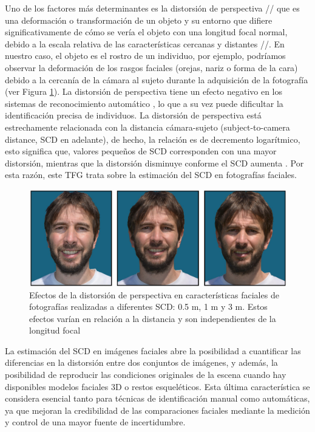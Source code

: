 Uno de los factores más determinantes es la distorsión de perspectiva \cite{8} // que es una deformación o transformación de un objeto y su entorno que difiere significativamente de cómo se vería el objeto con una longitud focal normal, debido a la escala relativa de las características cercanas y distantes //. En nuestro caso, el objeto es el rostro de un individuo, por ejemplo, podríamos observar la deformación de los rasgos faciales (orejas, nariz o forma de la cara) debido a la cercanía de la cámara al sujeto durante la adquisición de la fotografía \cite{12} (ver Figura \ref{fig1}). La distorsión de perspectiva tiene un efecto negativo en los sistemas de reconocimiento automático \cite{9,10,11}, lo que a su vez puede dificultar la identificación precisa de individuos. La distorsión de perspectiva está estrechamente relacionada con la distancia cámara-sujeto (subject-to-camera distance, SCD en adelante), de hecho, la relación es de decremento logarítmico, esto significa que, valores pequeños de SCD corresponden con una mayor distorsión, mientras que la distorsión disminuye conforme el SCD aumenta \cite{13}. Por esta razón, este TFG trata sobre la estimación del SCD en fotografías faciales.

\begin{figure}[h]
	\centering
	\includegraphics[scale=0.25]{imagenes/cap1/facial_distortion.png}
	\caption{Efectos de la distorsión de perspectiva en características faciales de fotografías realizadas a diferentes SCD: 0.5 m, 1 m y 3 m. Estos efectos varían en relación a la distancia y son independientes de la longitud focal \cite{14}}
	\label{fig1}
\end{figure}


La estimación del SCD en imágenes faciales abre la posibilidad a cuantificar las diferencias en la distorsión entre dos conjuntos de imágenes, y además, la posibilidad de reproducir las condiciones originales de la escena cuando hay disponibles modelos faciales 3D o restos esqueléticos. Esta última característica se considera esencial tanto para técnicas de identificación manual como automáticas, ya que mejoran la credibilidad de las comparaciones faciales mediante la medición y control de una mayor fuente de incertidumbre.

